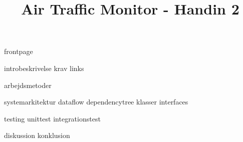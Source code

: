 \documentclass[a4paper]{article}								%
\title{Air Traffic Monitor - Handin 2}
\begin{document}

	{frontpage}

	\tableofcontents\thispagestyle{fancy} \newpage
	
	
	{introbeskrivelse}
	{krav}
	{links}

	{arbejdsmetoder}

	{systemarkitektur}
	{dataflow}
	{dependencytree}
	{klasser}
	{interfaces}

	{testing}
	{unittest}
	{integrationstest}

	{diskussion}
	{konklusion}
	



\end{document}

